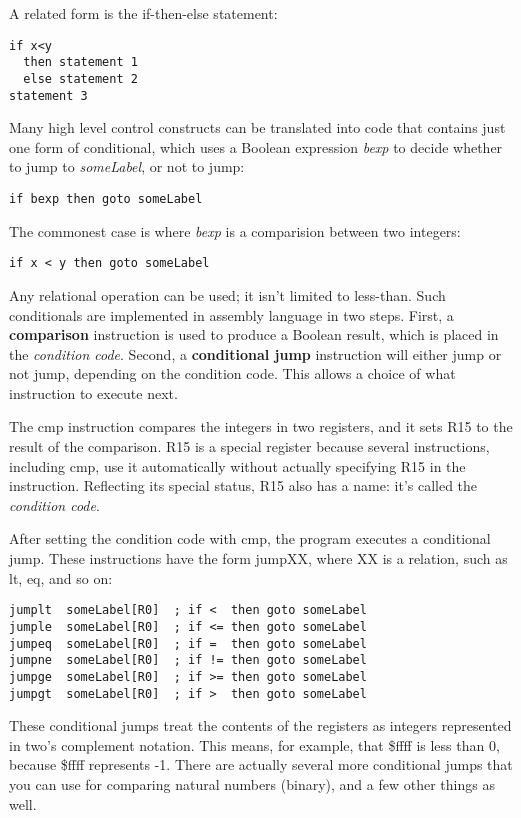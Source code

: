 \documentclass[11pt]{article}
\begin{document}
\begin{itemize}
A related form is the if-then-else statement:

\begin{verbatim}
if x<y
  then statement 1
  else statement 2
statement 3
\end{verbatim}

Many high level control constructs can be translated into code that
contains just one form of conditional, which uses a Boolean expression
\emph{bexp} to decide whether to jump to \emph{someLabel}, or not to jump:

\begin{verbatim}
if bexp then goto someLabel
\end{verbatim}

The commonest case is where \emph{bexp} is a comparision between two integers:

\begin{verbatim}
if x < y then goto someLabel
\end{verbatim}

Any relational operation can be used; it isn't limited to less-than.
Such conditionals are implemented in assembly language in two steps.
First, a \textbf{comparison} instruction is used to produce a Boolean result,
which is placed in the \emph{condition code}.  Second, a \textbf{conditional jump}
instruction will either jump or not jump, depending on the condition
code.  This allows a choice of what instruction to execute next.

The cmp instruction compares the integers in two registers, and it
sets R15 to the result of the comparison.  R15 is a special register
because several instructions, including cmp, use it automatically
without actually specifying R15 in the instruction.  Reflecting its
special status, R15 also has a name: it's called the \emph{condition code}.

After setting the condition code with cmp, the program executes a
conditional jump.  These instructions have the form jumpXX, where XX
is a relation, such as lt, eq, and so on:

\begin{verbatim}
jumplt  someLabel[R0]  ; if <  then goto someLabel
jumple  someLabel[R0]  ; if <= then goto someLabel
jumpeq  someLabel[R0]  ; if =  then goto someLabel
jumpne  someLabel[R0]  ; if != then goto someLabel
jumpge  someLabel[R0]  ; if >= then goto someLabel
jumpgt  someLabel[R0]  ; if >  then goto someLabel
\end{verbatim}

These conditional jumps treat the contents of the registers as integers
represented in two's complement notation.  This means, for example,
that \$ffff is less than 0, because \$ffff represents -1.  There are
actually several more conditional jumps that you can use for comparing
natural numbers (binary), and a few other things as well.


\end{itemize}
\end{document}
